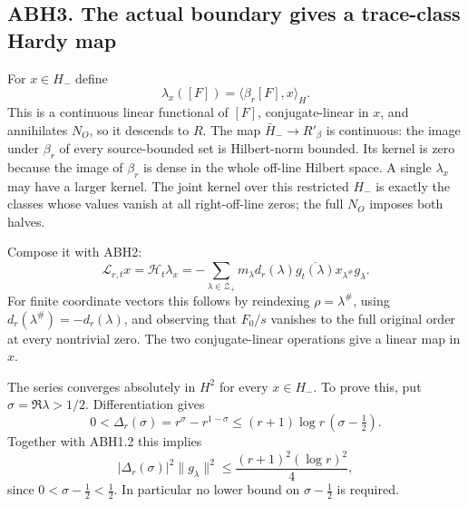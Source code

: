 \subsection{ABH3. The actual boundary gives a trace-class Hardy
map}\label{abh3.-the-actual-boundary-gives-a-trace-class-hardy-map}

For \(x\in H_-\) define \[
\lambda_x([F])=\langle\beta_r[F],x\rangle_H.
\tag{ABH3.1}
\] This is a continuous linear functional of \([F]\), conjugate-linear
in \(x\), and annihilates \(N_O\), so it descends to \(R\). The map
\(\bar H_-\to R'_\beta\) is continuous: the image under \(\beta_r\) of
every source-bounded set is Hilbert-norm bounded. Its kernel is zero
because the image of \(\beta_r\) is dense in the whole off-line Hilbert
space. A single \(\lambda_x\) may have a larger kernel. The joint kernel
over this restricted \(H_-\) is exactly the classes whose values vanish
at all right-off-line zeros; the full \(N_O\) imposes both halves.

Compose it with ABH2: \[
\boxed{\mathcal L_{r,t}x=\mathcal H_t\lambda_x
=-\sum_{\lambda\in\mathscr Z_+}
m_\lambda d_r(\lambda)\overline{g_t(\lambda)}
x_{\lambda^\#}g_\lambda.}
\tag{ABH3.2}
\] For finite coordinate vectors this follows by reindexing
\(\rho=\lambda^\#\), using \(d_r(\lambda^\#)=-d_r(\lambda)\), and
observing that \(F_0/s\) vanishes to the full original order at every
nontrivial zero. The two conjugate-linear operations give a linear map
in \(x\).

The series converges absolutely in \(H^2\) for every \(x\in H_-\). To
prove this, put \(\sigma=\Re\lambda>1/2\). Differentiation gives \[
0<\Delta_r(\sigma)=r^\sigma-r^{1-\sigma}
\le (r+1)\log r\,(\sigma-\tfrac12).
\] Together with ABH1.2 this implies \[
|\Delta_r(\sigma)|^2\|g_\lambda\|^2
\le\frac{(r+1)^2(\log r)^2}{4},
\tag{ABH3.3}
\] since \(0<\sigma-\tfrac12<\tfrac12\). In particular no lower bound on
\(\sigma-\tfrac12\) is required.

